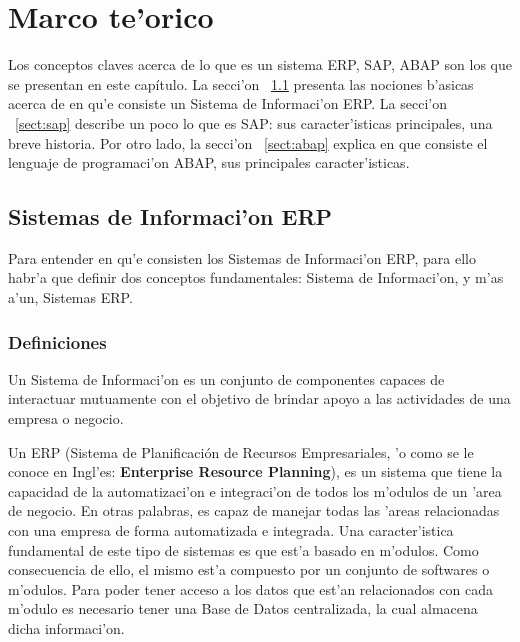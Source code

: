 \chapter{Marco te'orico} \label{chap:ssimilar}



Los conceptos claves acerca de lo que es un sistema ERP, SAP, ABAP son los que se presentan en este capítulo.
\newline
\newline
La secci'on ~\ref{sect:erp} presenta las nociones b'asicas acerca de en qu'e consiste un Sistema de Informaci'on ERP. La secci'on 
~\ref{sect:sap} describe un poco lo que es SAP: sus caracter'isticas principales, una  breve historia. Por otro lado, la secci'on ~\ref{sect:abap} explica en que consiste el lenguaje de programaci'on ABAP, sus principales caracter'isticas. 

\section{Sistemas de Informaci'on ERP} \label{sect:erp}

Para entender en qu'e consisten los Sistemas de Informaci'on ERP, para ello habr'a que definir dos conceptos fundamentales: Sistema de Informaci'on, y m'as a'un, Sistemas ERP. 

\subsection{Definiciones} \label{subsect:defprop}

\begin{definicion} \label{def:sisinfo}
	Un Sistema de Informaci'on es un conjunto de componentes capaces de interactuar mutuamente con el objetivo de brindar apoyo a las actividades de una empresa o negocio.

\end{definicion}

\begin{definicion} \label{def:siserp}
Un ERP (Sistema de Planificación de Recursos Empresariales, 'o como se le conoce en Ingl'es: \textbf{Enterprise Resource Planning}), es un sistema que tiene la capacidad de la automatizaci'on e integraci'on de todos los m'odulos de un 'area de negocio. En otras palabras, es capaz de manejar todas las 'areas relacionadas con una empresa de forma automatizada e integrada. 
\newline
\newline
Una caracter'istica fundamental de este tipo de sistemas es que est'a basado en m'odulos. Como consecuencia de ello, el mismo est'a compuesto por un conjunto de softwares o m'odulos. 
\newline
\newline
Para poder tener acceso a los datos que est'an relacionados con cada m'odulo es necesario tener una Base de Datos centralizada, la cual almacena dicha informaci'on. 
\end{definicion}

